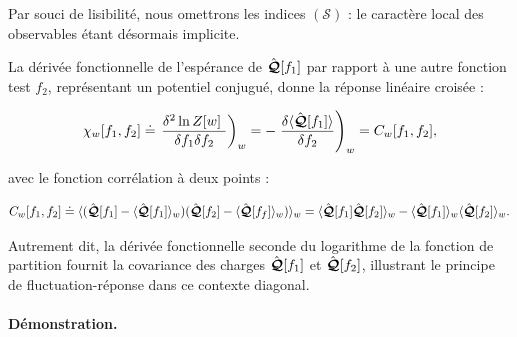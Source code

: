 Par souci de lisibilité, nous omettrons les indices \((\mathcal{S})\) : le caractère local des observables étant désormais implicite.




\medskip

La dérivée fonctionnelle de l'espérance de \( \hat{\bm{\mathcal{Q}}}[f_1] \) par rapport à une autre fonction test \( f_2 \), représentant un potentiel conjugué, donne la réponse linéaire croisée :

\begin{eqnarray*}
	\chi_w[f_1, f_2] \doteq   \left . \frac{ \delta^2 \ln Z [w] }{ \delta f_1 \delta f_2 } \right)_{w} =  - \left.\frac{\delta \langle \operator{\mathcal{Q}}[f_1] \rangle}{\delta f_2} \right )_w = C_w[f_1, f_2] , 	
\end{eqnarray*}

avec le fonction corrélation à deux points : 

\begin{eqnarray*}
	C_w[f_1, f_2] \doteq  	\langle ( \hat{\bm{\mathcal{Q}}}[f_1] - \langle \hat{\bm{\mathcal{Q}}}[f_1] \rangle_w ) ( \hat{\bm{\mathcal{Q}}}[f_2] - \langle \hat{\bm{\mathcal{Q}}}[f_f] \rangle_w  ) \rangle_w = \langle \hat{\bm{\mathcal{Q}}}[f_1] \hat{\bm{\mathcal{Q}}}[f_2] \rangle_w - \langle \hat{\bm{\mathcal{Q}}}[f_1] \rangle_w \langle \hat{\bm{\mathcal{Q}}}[f_2] \rangle_w.
\end{eqnarray*}


Autrement dit, la dérivée fonctionnelle seconde du logarithme de la fonction de partition fournit la covariance des charges \( \hat{\bm{\mathcal{Q}}}[f_1] \) et \( \hat{\bm{\mathcal{Q}}}[f_2] \), illustrant le principe de fluctuation-réponse dans ce contexte diagonal.

\paragraph{Démonstration.}

